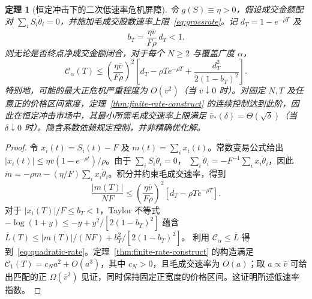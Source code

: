 \documentclass[11pt]{article}
\numberwithin{equation}{section}
\newtheorem{theorem}{定理}[section]
\theoremstyle{definition}
\theoremstyle{remark}
\begin{document}
\begin{theorem}[恒定冲击下的二次低速率危机屏障]\label{thm:quadratic-rate}
令 $g(S)\equiv\eta>0$，假设成交金额配对 $\sum_iS_i\dot\theta_i=0$，并施加毛成交股数速率上限~\eqref{eq:grossrate}。记 $d_T=1-e^{-\rho T}$ 及
\begin{equation}\label{eq:bsmall}
 b_T=\frac{\eta\bar v}{F\rho}\,d_T<1.
\end{equation}
则无论是否终点净成交金额闭合，对于\emph{每个} $N\ge2$ 与覆盖广度 $\alpha$，
\begin{equation}\label{eq:quadratic-rate}
\boxed{\ \mathcal C_\alpha(T)\le
\left(\frac{\eta\bar v}{F\rho}\right)^2
\left[d_T-\rho T e^{-\rho T}
 +\frac{d_T^2}{2(1-b_T)^2}\right].\ }
\end{equation}
特别地，可能的最大正危机严重程度为 $O(\bar v^2)$（当 $\bar v\downarrow0$ 时）。对固定 $N,T$ 及任意正的价格区间宽度，定理~\ref{thm:finite-rate-construct} 的连续控制\emph{达到此阶}，因此在恒定冲击市场中，其最小所需毛成交速率上限满足 $\bar v_*(\delta)=\Theta(\sqrt\delta)$（当 $\delta\downarrow0$ 时）。隐含系数依赖规定控制，并非精确优化解。
\end{theorem}
\begin{proof}
令 $x_i(t)=S_i(t)-F$ 及 $m(t)=\sum_i x_i(t)$。常数变易公式给出
$|x_i(t)|\le\eta\bar v(1-e^{-\rho t})/\rho$。由于 $\sum_iS_i\dot\theta_i=0$，
$\sum_i\dot\theta_i=-F^{-1}\sum_i x_i\dot\theta_i$，因此
$\dot m=-\rho m-(\eta/F)\sum_i x_i\dot\theta_i$。积分并约束毛成交速率，得到
\begin{equation}\label{eq:meanprice}
\frac{|m(T)|}{NF}\le
\left(\frac{\eta\bar v}{F\rho}\right)^2
 [d_T-\rho T e^{-\rho T}].
\end{equation}
对于 $|x_i(T)|/F\le b_T<1$，Taylor 不等式
$-\log(1+y)\le-y+y^2/[2(1-b_T)^2]$ 蕴含
$\overline L(T)\le |m(T)|/(NF)+b_T^2/[2(1-b_T)^2]$。
利用 $\mathcal C_\alpha\le\overline L$ 得到~\eqref{eq:quadratic-rate}。定理~\ref{thm:finite-rate-construct} 的构造满足 $\mathcal C_1(T)=c_Na^2+O(a^3)$，其中 $c_N>0$，且毛成交速率为 $O(a)$；取 $a\propto\bar v$ 可给出匹配的正 $\Omega(\bar v^2)$ 见证，同时保持固定正宽度的价格区间。这证明所述低速率指数。
\end{proof}
\end{document}
